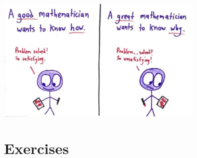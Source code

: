 	\begin{center}
			\includegraphics[width=0.75\textwidth]{figures/Functions/GreatMath_1.jpg}
	\end{center}



\ifcourse \pagebreak \fi

\ifcourse %
\newpage
\section{Exercises}


\renewcommand{\ExerciseListName}{Opgave}


\subsection*{} 

